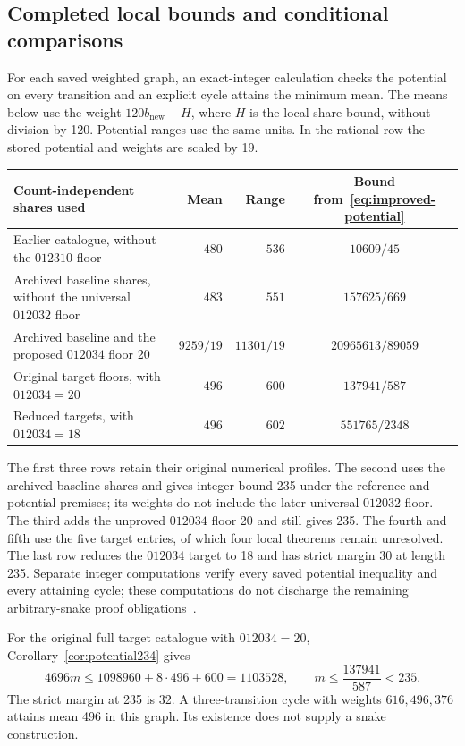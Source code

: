 \documentclass[11pt,a4paper]{article}
\theoremstyle{definition}
\theoremstyle{remark}
\begin{document}
\subsection{Completed local bounds and conditional comparisons}
For each saved weighted graph, an exact-integer calculation checks the
potential on every transition and an explicit cycle attains the minimum mean. The means below use the weight
$120b_{\mathrm{new}}+H$, where $H$ is the local share bound, without division by 120. Potential ranges use the same
units. In the rational row the stored potential and weights are scaled by 19.
\begin{center}\small
\begin{tabular}{p{}r r c}
\toprule
Count-independent shares used & Mean & Range & Bound from~\eqref{eq:improved-potential}\\\midrule
Earlier catalogue, without the $012310$ floor & $480$ & $536$ & $10609/45$\\
Archived baseline shares, without the universal $012032$ floor & $483$ & $551$ & $157625/669$\\
Archived baseline and the proposed $012034$ floor 20 & $9259/19$ & $11301/19$ & $20965613/89059$\\
Original target floors, with $012034=20$ & $496$ & $600$ & $137941/587$\\
Reduced targets, with $012034=18$ & $496$ & $602$ & $551765/2348$\\
\bottomrule
\end{tabular}
\end{center}
The first three rows retain their original numerical profiles. The second
uses the archived baseline shares and gives integer bound 235 under the
reference and potential premises; its weights do not include the later
universal $012032$ floor. The third adds the unproved $012034$ floor 20
and still gives 235. The fourth and fifth use the five target entries,
of which four local theorems remain unresolved. The last row reduces the
$012034$ target to 18 and has strict margin 30 at length 235. Separate integer computations verify every saved potential
inequality and every attaining cycle; these computations do not discharge the
remaining arbitrary-snake proof obligations~\cite{countfreearchive,shareclosurearchive,targetsharearchive}.

For the original full target catalogue with $012034=20$, Corollary~\ref{cor:potential234} gives
\[
4696m\le1098960+8\cdot496+600=1103528,
\qquad m\le\frac{137941}{587}<235.
\]
The strict margin at 235 is 32. A three-transition cycle with weights
$616,496,376$ attains mean 496 in this graph. Its existence does not supply
a snake construction.
\end{document}
